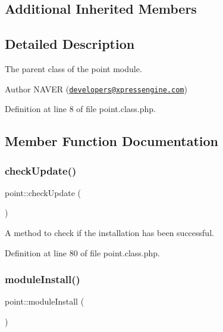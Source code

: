 \subsection*{Additional Inherited Members}


\subsection{Detailed Description}
The parent class of the point module. 

\begin{DoxyAuthor}{Author}
N\+A\+V\+ER (\href{mailto:developers@xpressengine.com}{\tt developers@xpressengine.\+com}) 
\end{DoxyAuthor}


Definition at line 8 of file point.\+class.\+php.



\subsection{Member Function Documentation}
\mbox{\label{classpoint_a26afa184808e8535aec718cebd34c908}} 
\subsubsection{\texorpdfstring{check\+Update()}{checkUpdate()}}
{\footnotesize\ttfamily point\+::check\+Update (\begin{DoxyParamCaption}{ }\end{DoxyParamCaption})}



A method to check if the installation has been successful. 



Definition at line 80 of file point.\+class.\+php.

\mbox{\label{classpoint_a6f542fa43f0fc00f21eaf36fa0c3f9c0}} 
\subsubsection{\texorpdfstring{module\+Install()}{moduleInstall()}}
{\footnotesize\ttfamily point\+::module\+Install (\begin{DoxyParamCaption}{ }\end{DoxyParamCaption})}



